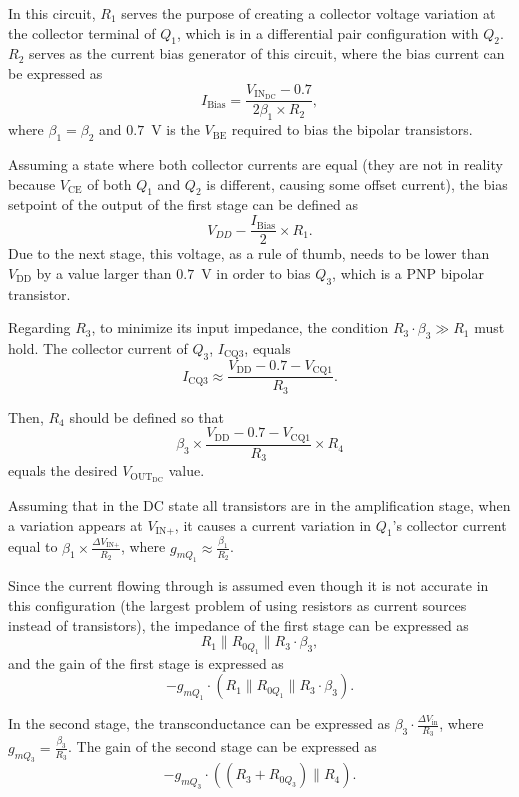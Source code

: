 \documentclass[12pt]{article}
\begin{document}
In this circuit, $R_1$ serves the purpose of creating a collector voltage variation at the collector terminal of $Q_1$, which is in a differential pair configuration with $Q_2$. $R_2$ serves as the current bias generator of this circuit, where the bias current can be expressed as  
\begin{equation}
    I_{\text{Bias}} = \frac{V_{\text{IN}_{\text{DC}}} - 0.7}{2 \beta_{1} \times R_2},
\end{equation}  
where $\beta_1 = \beta_2$ and $0.7$~V is the $V_{\text{BE}}$ required to bias the bipolar transistors.  

Assuming a state where both collector currents are equal (they are not in reality because $V_{\text{CE}}$ of both $Q_1$ and $Q_2$ is different, causing some offset current), the bias setpoint of the output of the first stage can be defined as  
\[
V_{DD} - \frac{I_{\text{Bias}}}{2} \times R_1.
\]  
Due to the next stage, this voltage, as a rule of thumb, needs to be lower than $V_{\text{DD}}$ by a value larger than $0.7$~V in order to bias $Q_3$, which is a PNP bipolar transistor.  

Regarding $R_3$, to minimize its input impedance, the condition $R_3 \cdot \beta_3 \gg R_1$ must hold. The collector current of $Q_3$, $I_{\text{CQ3}}$, equals  
\[
I_{\text{CQ3}} \approx  \frac{V_{\text{DD}} - 0.7 - V_{\text{CQ1}}}{R_3}.
\]  

Then, $R_4$ should be defined so that  
\[
\beta_3 \times \frac{V_{\text{DD}} - 0.7 - V_{\text{CQ1}}}{R_3} \times R_4
\]  
equals the desired $V_{\text{OUT}_{\text{DC}}}$ value.  


Assuming that in the DC state all transistors are in the amplification stage, when a variation appears at $V_{\text{IN+}}$, it causes a current variation in $Q_1$'s collector current equal to $\beta_1 \times \frac{\Delta V_{\text{IN+}}}{R_2}$, where $g_{mQ_1} \approx \frac{\beta_1}{R_2}$.  

Since the current flowing through is assumed even though it is not accurate in this configuration (the largest problem of using resistors as current sources instead of transistors), the impedance of the first stage can be expressed as  
\[
R_1 \parallel R_{0Q_1} \parallel R_3 \cdot \beta_3,
\]  
and the gain of the first stage is expressed as  
\[
-g_{mQ_1} \cdot \left( R_1 \parallel R_{0Q_1} \parallel R_3 \cdot \beta_3 \right).
\]  

In the second stage, the transconductance can be expressed as $\beta_3 \cdot \frac{\Delta V_{\text{in}}}{R_3}$, where $g_{mQ_3} = \frac{\beta_3}{R_3}$. The gain of the second stage can be expressed as  
\[
-g_{mQ_3} \cdot \left( (R_3 + R_{0Q_3}) \parallel R_4 \right).
\]  
\end{document}
